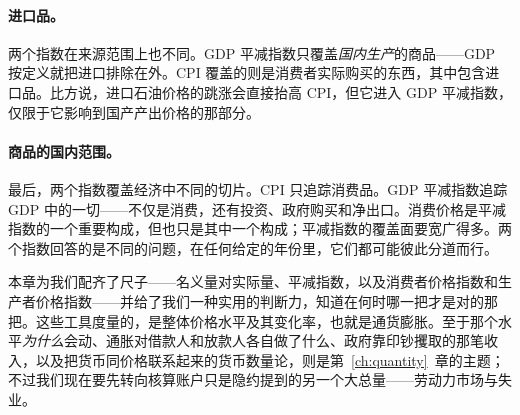 \paragraph{进口品。} 两个指数在来源范围上也不同。GDP 平减指数只覆盖\emph{国内生产}的商品——GDP 按定义就把进口排除在外。CPI 覆盖的则是消费者实际购买的东西，其中包含进口品。比方说，进口石油价格的跳涨会直接抬高 CPI，但它进入 GDP 平减指数，仅限于它影响到国产产出价格的那部分。

\paragraph{商品的国内范围。} 最后，两个指数覆盖经济中不同的切片。CPI 只追踪消费品。GDP 平减指数追踪 GDP 中的一切——不仅是消费，还有投资、政府购买和净出口。消费价格是平减指数的一个重要构成，但也只是其中一个构成；平减指数的覆盖面要宽广得多。两个指数回答的是不同的问题，在任何给定的年份里，它们都可能彼此分道而行。


本章为我们配齐了尺子——名义量对实际量、平减指数，以及消费者价格指数和生产者价格指数——并给了我们一种实用的判断力，知道在何时哪一把才是对的那把。这些工具度量的，是整体价格水平及其变化率，也就是通货膨胀。至于那个水平\emph{为什么}会动、通胀对借款人和放款人各自做了什么、政府靠印钞攫取的那笔收入，以及把货币同价格联系起来的货币数量论，则是第~\ref{ch:quantity}~章的主题；不过我们现在要先转向核算账户只是隐约提到的另一个大总量——劳动力市场与失业。
